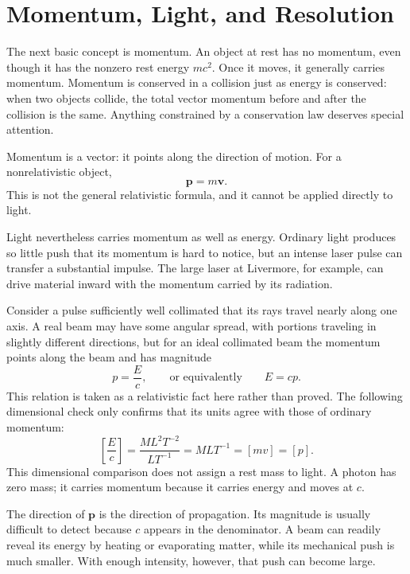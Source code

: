 \section{Momentum, Light, and Resolution}

The next basic concept is momentum. An object at rest has no momentum, even though it has the nonzero rest energy \(mc^2\). Once it moves, it generally carries momentum. Momentum is conserved in a collision just as energy is conserved: when two objects collide, the total vector momentum before and after the collision is the same. Anything constrained by a conservation law deserves special attention.

Momentum is a vector: it points along the direction of motion. For a nonrelativistic object,
\begin{equation}
\mathbf p=m\mathbf v.
\end{equation}
This is not the general relativistic formula, and it cannot be applied directly to light.

Light nevertheless carries momentum as well as energy. Ordinary light produces so little push that its momentum is hard to notice, but an intense laser pulse can transfer a substantial impulse. The large laser at Livermore, for example, can drive material inward with the momentum carried by its radiation.

Consider a pulse sufficiently well collimated that its rays travel nearly along one axis. A real beam may have some angular spread, with portions traveling in slightly different directions, but for an ideal collimated beam the momentum points along the beam and has magnitude
\begin{equation}
p=\frac{E}{c},
\qquad\text{or equivalently}\qquad
E=cp.
\end{equation}
This relation is taken as a relativistic fact here rather than proved. The following dimensional check only confirms that its units agree with those of ordinary momentum:
\begin{equation}
\left[\frac{E}{c}\right]
=
\frac{M L^2 T^{-2}}{L T^{-1}}
=
M L T^{-1}
=
[m v]
=
[p].
\end{equation}
This dimensional comparison does not assign a rest mass to light. A photon has zero mass; it carries momentum because it carries energy and moves at \(c\).

The direction of \(\mathbf p\) is the direction of propagation. Its magnitude is usually difficult to detect because \(c\) appears in the denominator. A beam can readily reveal its energy by heating or evaporating matter, while its mechanical push is much smaller. With enough intensity, however, that push can become large.

